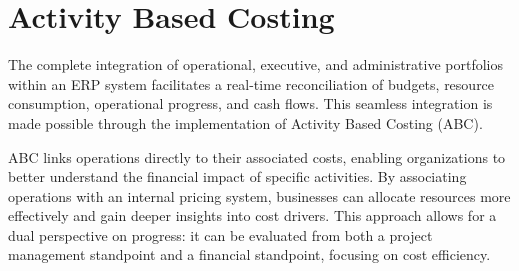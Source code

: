\section{Activity Based Costing}

The complete integration of operational, executive, and administrative portfolios within an ERP system facilitates a real-time reconciliation of budgets, resource consumption, operational progress, and cash flows.
This seamless integration is made possible through the implementation of Activity Based Costing (ABC).

ABC links operations directly to their associated costs, enabling organizations to better understand the financial impact of specific activities. 
By associating operations with an internal pricing system, businesses can allocate resources more effectively and gain deeper insights into cost drivers. 
This approach allows for a dual perspective on progress: it can be evaluated from both a project management standpoint and a financial standpoint, focusing on cost efficiency.